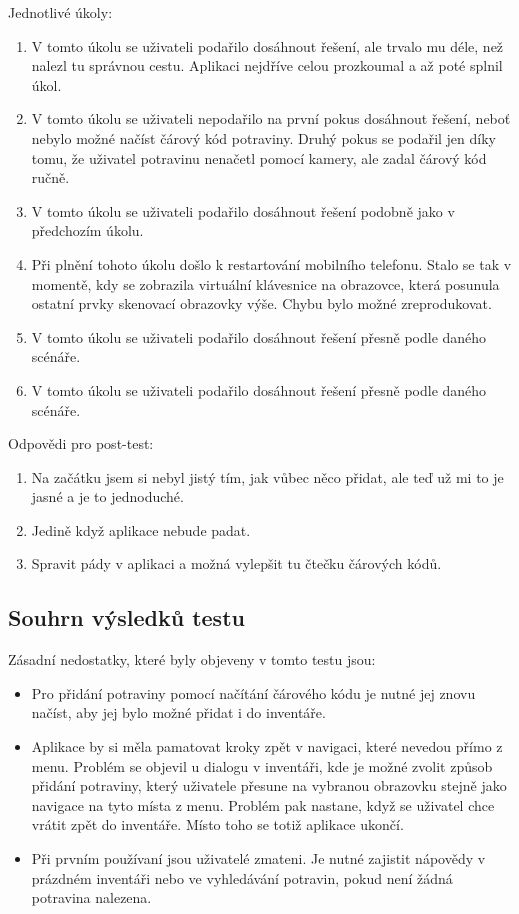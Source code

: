\documentclass[thesis=B,czech]{FITthesis}[2013/10/20]
\begin{document}
Jednotlivé úkoly:
\begin{enumerate}
  \item V tomto úkolu se uživateli podařilo dosáhnout řešení, ale trvalo mu déle, než nalezl tu správnou cestu. Aplikaci nejdříve celou prozkoumal a až poté splnil úkol.
  \item V tomto úkolu se uživateli nepodařilo na první pokus dosáhnout řešení, neboť nebylo možné načíst čárový kód potraviny. Druhý pokus se podařil jen díky tomu, že uživatel potravinu nenačetl pomocí kamery, ale zadal čárový kód ručně.
  \item V tomto úkolu se uživateli podařilo dosáhnout řešení podobně jako v předchozím úkolu.
  \item Při plnění tohoto úkolu došlo k restartování mobilního telefonu. Stalo se tak v momentě, kdy se zobrazila virtuální klávesnice na obrazovce, která posunula ostatní prvky skenovací obrazovky výše. Chybu bylo možné zreprodukovat.
  \item V tomto úkolu se uživateli podařilo dosáhnout řešení přesně podle daného scénáře.
  \item V tomto úkolu se uživateli podařilo dosáhnout řešení přesně podle daného scénáře.
\end{enumerate}


Odpovědi pro post-test:
\begin{enumerate}
  \item Na začátku jsem si nebyl jistý tím, jak vůbec něco přidat, ale teď už mi to je jasné a je to jednoduché.
  \item Jedině když aplikace nebude padat.
  \item Spravit pády v aplikaci a možná vylepšit tu čtečku čárových kódů.
\end{enumerate}

\subsection{Souhrn výsledků testu}

Zásadní nedostatky, které byly objeveny v tomto testu jsou:
\begin{itemize}
	\item{Pro přidání potraviny pomocí načítání čárového kódu je nutné jej znovu načíst, aby jej bylo možné přidat i do inventáře.}
	\item{Aplikace by si měla pamatovat kroky zpět v navigaci, které nevedou přímo z menu. Problém se objevil u dialogu v inventáři, kde je možné zvolit způsob přidání potraviny, který uživatele přesune na vybranou obrazovku stejně jako navigace na tyto místa z menu. Problém pak nastane, když se uživatel chce vrátit zpět do inventáře. Místo toho se totiž aplikace ukončí.}
	\item{Při prvním používaní jsou uživatelé zmateni. Je nutné zajistit nápovědy v prázdném inventáři nebo ve vyhledávání potravin, pokud není žádná potravina nalezena.}
\end{itemize}
\end{document}
